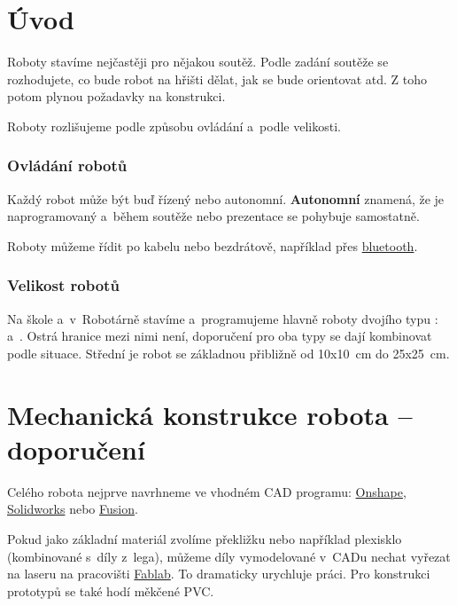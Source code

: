 

\section{Úvod}

\label{konstrukce}
 

Roboty stavíme nejčastěji pro nějakou soutěž. 
Podle zadání soutěže se rozhodujete, co bude robot na hřišti dělat, jak se bude orientovat atd.
Z toho potom plynou požadavky na konstrukci. 

Roboty rozlišujeme podle způsobu ovládání a~podle velikosti. 

\subsubsection*{Ovládání robotů} 

Každý robot může být buď řízený nebo autonomní. \label{autonomni}
{\bf Autonomní }znamená, že je naprogramovaný a~během soutěže nebo prezentace se pohybuje samostatně.  

Roboty můžeme řídit po kabelu nebo bezdrátově, například přes  \hyperlink{bluetooth}{bluetooth}.   


\subsubsection*{Velikost robotů} 

Na škole a~v~Robotárně stavíme a~programujeme hlavně roboty dvojího typu : a~.   
Ostrá hranice mezi nimi není, doporučení pro oba typy se dají kombinovat podle situace.  
Střední je robot se základnou přibližně od 10x10~cm do 25x25~cm.

\section{Mechanická konstrukce robota -- doporučení}

Celého robota nejprve navrhneme ve vhodném  \label{cad} CAD programu:  \href{https://www.onshape.com/}{Onshape}, 
 \href{http://www.solidworks.com}{Solidworks} nebo \href{https://www.autodesk.com/products/fusion-360/students-teachers-educators}{Fusion}.

 
Pokud jako základní materiál zvolíme překližku nebo například plexisklo (kombinované s~díly z~lega),
můžeme díly vymodelované v~CADu nechat vyřezat na laseru na pracovišti \href{https://www.fablabbrno.cz}{Fablab}.
To dramaticky urychluje práci.    
Pro konstrukci prototypů se také hodí měkčené PVC.  

